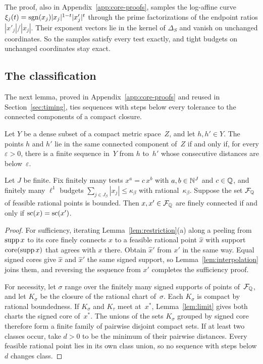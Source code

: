 The proof, also in Appendix~\ref{app:core-proofs}, samples the log-affine curve $\xi_j(t)=\operatorname{sgn}(x_j)|x_j|^{1-t}|x'_j|^{t}$ through the prime
factorizations of the endpoint ratios $|x'_j|/|x_j|$. Their exponent
vectors lie in the kernel of $\Delta_S$ and vanish on unchanged
coordinates. So the samples satisfy every test exactly, and tight budgets
on unchanged coordinates stay exact.

\subsection{The classification}\label{sec:classification}

The next lemma, proved in Appendix~\ref{app:core-proofs} and reused in
Section~\ref{sec:timing}, ties sequences with steps below every tolerance
to the connected components of a compact closure.

\begin{lemma}\label{lem:compact-chain}
Let $Y$ be a dense subset of a compact metric space~$Z$, and let
$h,h'\in Y$. %
The points $h$ and $h'$ lie in the same connected component of~$Z$ if and
only if, for every $\varepsilon>0$, there is a finite sequence in~$Y$ from
$h$ to~$h'$ whose consecutive distances are below~$\varepsilon$.
\end{lemma}

\begin{theorem}\label{thm:core}
Let $J$ be finite. Fix finitely many tests $x^a=c\,x^b$ with
$a,b\in\mathbb{N}^J$ and $c\in\mathbb{Q}$, and finitely many $\ell^1$ budgets
$\sum_{j\in J_\beta}|x_j|\le\kappa_\beta$ with rational~$\kappa_\beta$.
Suppose the set $\mathcal F_{\mathbb{Q}}$ of feasible rational points is bounded. Then
$x,x'\in\mathcal F_{\mathbb{Q}}$ are finely connected if and only if $\operatorname{sc}(x)=\operatorname{sc}(x')$.
\end{theorem}

\begin{proof}
For sufficiency, iterating Lemma~\ref{lem:restriction}(a) along a peeling
from $\operatorname{supp} x$ to its core finely connects $x$ to a feasible rational
point $\hat x$ with support $\operatorname{core}(\operatorname{supp} x)$ that agrees with $x$ there.
Obtain $\hat x'$ from $x'$ in the same way. Equal signed cores give $\hat x$
and $\hat x'$ the same signed support, so Lemma~\ref{lem:interpolation}
joins them, and reversing the sequence from $x'$ completes the
sufficiency proof.

For necessity, let $\sigma$ range over the finitely many signed supports
of points of~$\mathcal F_{\mathbb{Q}}$, and let $K_\sigma$ be the closure of the rational chart
of~$\sigma$. Each $K_\sigma$ is compact by rational boundedness. If $K_\sigma$ and
$K_\tau$ meet at~$x^*$, Lemma~\ref{lem:limit} gives both charts the signed
core of~$x^*$. The unions of the sets $K_\sigma$ grouped by signed core
therefore form a finite family of pairwise disjoint compact sets. If at
least two classes occur, take $d>0$ to be the minimum of their pairwise
distances. Every feasible rational point lies in its own class union, so
no sequence with steps below $d$ changes class.
\end{proof}

